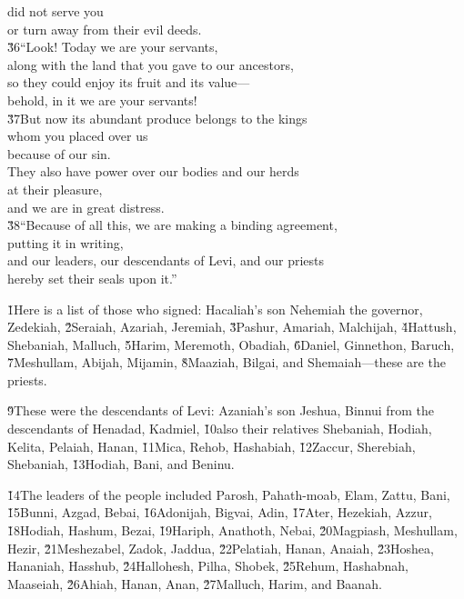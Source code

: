 \begin{poetry}
\poeml did not serve you \\
\poemll    or turn away from their evil deeds. \\
\poeml \v{36}``Look! Today we are your servants, \\
\poemll    along with the land that you gave to our ancestors, \\
\poeml so they could enjoy its fruit and its value--- \\
\poemll    behold, in it we are your servants! \\
\poeml \v{37}But now its abundant produce belongs to the kings \\
\poemll    whom you placed over us \\
\poemlll       because of our sin. \\
\poeml They also have power over our bodies and our herds \\
\poemll    at their pleasure, \\
\poemlll       and we are in great distress. \\
\poeml \v{38}``Because of all this, we are making a binding agreement, \\
\poemll    putting it in writing, \\
\poeml and our leaders, our descendants of Levi, and our priests \\
\poemll    hereby set their seals upon it.''
\end{poetry}

\v{1}Here is a list of those who signed: Hacaliah's son Nehemiah the governor, Zedekiah, \v{2}Seraiah, Azariah, Jeremiah, \v{3}Pashur, Amariah, Malchijah, \v{4}Hattush, Shebaniah, Malluch, \v{5}Harim, Meremoth, Obadiah, \v{6}Daniel, Ginnethon, Baruch, \v{7}Meshullam, Abijah, Mijamin, \v{8}Maaziah, Bilgai, and Shemaiah---these are the priests.

\v{9}These were the descendants of Levi: Azaniah's son Jeshua, Binnui from the descendants of Henadad, Kadmiel, \v{10}also their relatives Shebaniah, Hodiah, Kelita, Pelaiah, Hanan, \v{11}Mica, Rehob, Hashabiah, \v{12}Zaccur, Sherebiah, Shebaniah, \v{13}Hodiah, Bani, and Beninu.

\v{14}The leaders of the people included Parosh, Pahath-moab, Elam, Zattu, Bani, \v{15}Bunni, Azgad, Bebai, \v{16}Adonijah, Bigvai, Adin, \v{17}Ater, Hezekiah, Azzur, \v{18}Hodiah, Hashum, Bezai, \v{19}Hariph, Anathoth, Nebai, \v{20}Magpiash, Meshullam, Hezir, \v{21}Meshezabel, Zadok, Jaddua, \v{22}Pelatiah, Hanan, Anaiah, \v{23}Hoshea, Hananiah, Hasshub, \v{24}Hallohesh, Pilha, Shobek, \v{25}Rehum, Hashabnah, Maaseiah, \v{26}Ahiah, Hanan, Anan, \v{27}Malluch, Harim, and Baanah.

